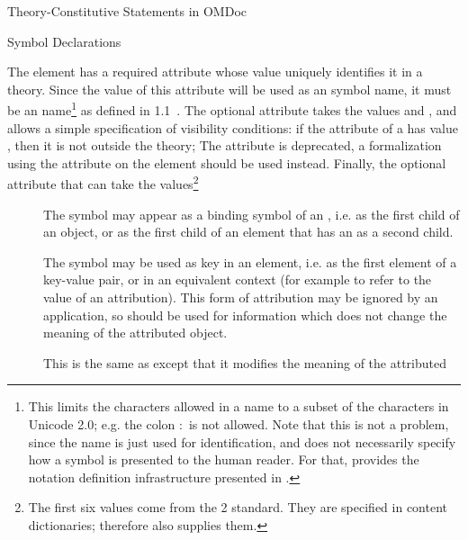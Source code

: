 \begin{omgroup}[short=Mathematical Statements,id=statements]
\begin{omgroup}[id=constitutive-statements]{Theory-Constitutive Statements in OMDoc}
\begin{module}[id=constitutive-statements]
\begin{omgroup}[id=symbol-dec]{Symbol Declarations}
\begin{definition}[id=symbol.def]
  The {} element has a required attribute  whose
  value uniquely identifies it in a theory.  Since the value of this attribute will be
  used as an {\openmath} symbol name, it must be an {\xml} name\footnote{This limits the
    characters allowed in a name to a subset of the characters in Unicode 2.0; e.g. the
    colon $\colon$ is not allowed. Note that this is not a problem, since the name is just
    used for identification, and does not necessarily specify how a symbol is presented to
    the human reader. For that, \omdoc provides the notation definition infrastructure
    presented in {}.} as defined in {\xml} 1.1~\cite{xml1.1:04}. The optional
  attribute  takes the values 
  and , and allows a simple specification of visibility
  conditions: if the  attribute of a  has
  value , then it is not 
  outside the theory; The {} attribute is deprecated, a
  formalization using the  attribute on the
   element should be used instead.  Finally, the optional attribute
   that can take the values\footnote{The first six values come
    from the {\openmath}2 standard. They are specified in content dictionaries; therefore
    \omdoc also supplies them.}
\begin{description}
\item[] The symbol may appear as a binding symbol of an
  {}, i.e. as the first child of an 
  object, or as the first child of an  element that has an
   as a second child.
\item[] The symbol may be used as key in an
  {\openmath}  element, i.e. as the first element of a
  key-value pair, or in an equivalent context (for example to refer to the value of an
  attribution).  This form of attribution may be ignored by an application, so should be
  used for information which does not change the meaning of the attributed {\openmath}
  object.
\item[] This is the same as
  {} except that it modifies the meaning of the attributed

\end{description}
\end{definition}
\end{omgroup}
\end{module}
\end{omgroup}
\end{omgroup}
